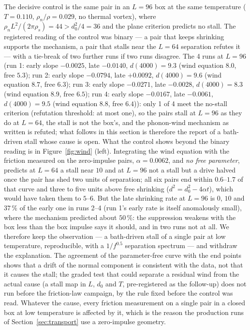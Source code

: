 \documentclass[11pt,a4paper]{article}
\begin{document}
The decisive control is the same pair in an $L=96$ box at the same temperature ($T=0.110$, $\rho_n/\rho=0.029$,
no thermal vortex), where $\rho_nL^2/(2\pi\rho_s)=44>d_0^2/4=36$ and the plane criterion predicts no stall.
The registered reading of the control was binary --- a pair that keeps shrinking supports the mechanism, a pair that
stalls near the $L=64$ separation refutes it --- with a tie-break of two further runs if two runs disagree.
The 4 runs at $L=96$ (run 1: early slope $-0.0025$, late $-0.0140$, $d(4000)=9.3$ (wind equation $8.0$, free $5.3$); run 2: early slope $-0.0794$, late $+0.0092$, $d(4000)=9.6$ (wind equation $8.7$, free $6.3$); run 3: early slope $-0.0271$, late $-0.0028$, $d(4000)=8.3$ (wind equation $8.9$, free $6.5$); run 4: early slope $-0.0167$, late $-0.0061$, $d(4000)=9.5$ (wind equation $8.8$, free $6.4$)): only 1 of 4 meet the no-stall criterion (refutation threshold: at most one), so the pairs stall at $L=96$ as they do at $L=64$, the stall is not the box's, and the phonon-wind mechanism as written is refuted; what follows in this section is therefore the report of a bath-driven stall whose cause is open. What the control shows beyond the
binary reading is in Figure~\ref{fig:wind} (left). Integrating the wind equation with the friction measured on
the zero-impulse pairs, $\alpha=0.0062$, and \emph{no free parameter}, predicts at $L=64$ a stall near $10$ and at
$L=96$ not a stall but a drive halved once the pair has shed two units of separation; all six pairs end within
$0.6$--$1.7$ of that curve and three to five units above free shrinking ($d^2=d_0^2-4\alpha t$), which would have
taken them to $5$--$6$. But the late shrinking rate at $L=96$ is $0$, $10$ and $37\,\%$ of the early one in runs 2--4 (run 1's early
rate is itself anomalously small), where the mechanism predicted about $50\,\%$: the suppression weakens with the
box less than the box impulse says it should, and in two runs not at all. We therefore keep the observation --- a bath-driven stall of a single pair at
low temperature, reproducible, with a $1/f^{0.5}$ separation spectrum --- and withdraw the explanation. The
agreement of the parameter-free curve with the end points shows that a drift of the normal component is
consistent with the data, not that it causes the stall; the graded test that could separate a residual wind
from the actual cause (a stall map in $L$, $d_0$ and $T$, pre-registered as the follow-up) does not run before the
friction-law campaign, by the rule fixed before the control was read. Whatever the cause, every friction measurement
on a single pair in a closed box at low temperature is affected by it, which is the reason the production runs
of Section~\ref{sec:transport} use a
zero-impulse geometry.
\end{document}
